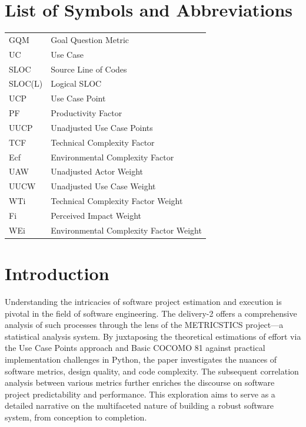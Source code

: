 \documentclass[english,12pt,a4paper]{report}
\begin{document}
	\chapter*{List of Symbols and Abbreviations}
	\noindent\begin{tabular}{ll}
		GQM & Goal Question Metric\\
		UC & Use Case\\
		SLOC & Source Line of Codes\\
		SLOC(L) & Logical SLOC\\
		UCP & Use Case Point\\
		PF & Productivity Factor\\
		UUCP & Unadjusted Use Case Points\\
		TCF & Technical Complexity Factor\\
		Ecf & Environmental Complexity Factor\\
		UAW & Unadjusted Actor Weight\\
		UUCW & Unadjusted Use Case Weight\\
		WTi & Technical Complexity Factor Weight\\
		Fi & Perceived Impact Weight\\
		WEi & Environmental Complexity Factor Weight
		
		
	\end{tabular}
	\listoffigures{}
	\listoftables{}
	
	\chapter{Introduction}

	 Understanding the intricacies of software project estimation and execution is pivotal in the field of software engineering. The delivery-2 offers a comprehensive analysis of such processes through the lens of the METRICSTICS project—a statistical analysis system. By juxtaposing the theoretical estimations of effort via the Use Case Points approach and Basic COCOMO 81 against practical implementation challenges in Python, the paper investigates the nuances of software metrics, design quality, and code complexity. The subsequent correlation analysis between various metrics further enriches the discourse on software project predictability and performance. This exploration aims to serve as a detailed narrative on the multifaceted nature of building a robust software system, from conception to completion.
\end{document}
